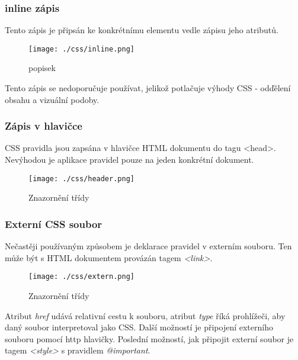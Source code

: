 \documentclass[main.tex]{subfiles}
\begin{document}
\subsubsection{inline zápis}
Tento zápis je připsán ke konkrétnímu elementu vedle zápisu jeho atributů.
		\begin{figure}[h]
			\centering
			\texttt{[image: ./css/inline.png]}
			\caption{popisek}
		\end{figure}
Tento zápis se nedoporučuje používat, jelikož potlačuje výhody CSS - odďělení obsahu a vizuální podoby.

\subsubsection{Zápis v hlavičce}
CSS pravidla jsou zapsána v hlavičce HTML dokumentu do tagu <head>. Nevýhodou je aplikace pravidel pouze na jeden konkrétní dokument.
		\begin{figure}[h]
			\centering
			\texttt{[image: ./css/header.png]}
			\caption{Znazornění třídy}
		\end{figure}
\subsubsection{Externí CSS soubor}
Nečastěji používaným způsobem je deklarace pravidel v externím souboru. Ten může být s HTML dokumentem provázán tagem \textit{<link>}.
		\begin{figure}[h]
			\centering
			\texttt{[image: ./css/extern.png]}
			\caption{Znazornění třídy}
		\end{figure}
Atribut \textit{href} udává relativní cestu k souboru, atribut \textit{type} říká prohlížeči, aby daný soubor interpretoval jako CSS. 
Další možností je připojení externího souboru pomocí http hlavičky.
Poslední možností, jak připojit externí soubor je tagem \textit{<style>} s pravidlem \textit{@important}.




\end{document}
